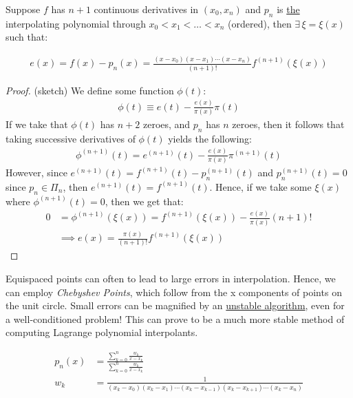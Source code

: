 \documentclass{article}
\begin{document}
\gap
{} Suppose $f$ has $n+1$ continuous derivatives in $(x_0, x_n)$ and $p_n$ is \underline{the} interpolating polynomial through $x_0 < x_1 < \ldots < x_n$ (ordered), then $\exists\, \xi = \xi(x)$ such that:

\begin{align*}
  e(x) = f(x) - p_n(x) = \frac{(x-x_0)(x-x_1) \cdots (x-x_n)}{(n+1)!}f^{(n+1)}(\xi(x))
\end{align*}

\begin{proof} (sketch)
  We define some function $\phi(t)$:
  \begin{align*}
    \phi(t) \equiv e(t) - \frac{e(x)}{\pi(x)}\pi(t)
  \end{align*}
  If we take that $\phi(t)$ has $n+2$ zeroes, and $p_n$ has $n$ zeroes, then it follows that taking successive derivatives of $\phi(t)$ yields the following:
  \begin{align*}
    \phi^{(n+1)}(t) = e^{(n + 1)}(t) - \frac{e(x)}{\pi(x)}\pi^{(n + 1)}(t)
  \end{align*}
  However, since $e^{(n + 1)}(t) = f^{(n + 1)}(t) - p_n^{(n + 1)}(t)$ and $p_n^{(n + 1)}(t) = 0$ since $p_n \in \Pi_n$, then $e^{(n + 1)}(t) = f^{(n + 1)}(t)$. Hence, if we take some $\xi(x)$ where $\phi^{(n + 1)}(t) = 0$, then we get that:
  \begin{align*}
    0 &= \phi^{(n + 1)}(\xi(x)) = f^{(n + 1)}(\xi(x)) - \frac{e(x)}{\pi(x)}(n + 1)!\\
      &\implies e(x) = \frac{\pi(x)}{(n+1)!}f^{(n + 1)}(\xi(x))
  \end{align*}
\end{proof}

 Equispaced points can often to lead to large errors in interpolation. Hence, we can employ \textit{Chebyshev Points}, which follow from the x components of points on the unit circle.
\gap
{} Small errors can be magnified by an \underline{unstable algorithm}, even for a well-conditioned problem!
\gap
{} This can prove to be a much more stable method of computing Lagrange polynomial interpolants.

\begin{align*}
  p_n(x) &= \frac{\sum_{k=0}^{n} \frac{w_k}{x-x_k}}{\sum_{k=0}^{n} \frac{w_k}{x-x_k}}\\
  w_k &= \frac{1}{(x_k-x_0)(x_k - x_1) \cdots (x_k - x_{k-1}) (x_k-x_{k+1}) \cdots (x_k - x_n)}
\end{align*}
\end{document}
